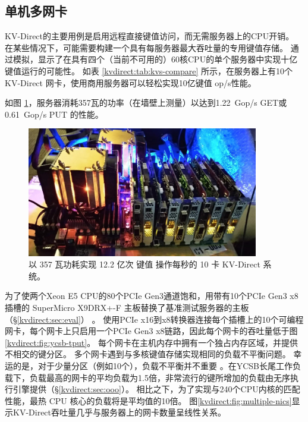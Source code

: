 \subsection{单机多网卡}
\label{kvdirect:sec:multi-nic}

KV-Direct的主要用例是启用远程直接键值访问，而无需服务器上的CPU开销。
在某些情况下，可能需要构建一个具有每服务器最大吞吐量的专用键值存储。
通过模拟，\cite {li2016full}显示了在具有四个（当前不可用的）60核CPU的单个服务器中实现十亿键值运行的可能性。
如表 \ref{kvdirect:tab:kvs-compare} 所示，在服务器上有10个KV-Direct 网卡，使用商用服务器可以轻松实现10亿键值 op/s性能。

如图 \ref{kvdirect:fig:photo}，服务器消耗357瓦的功率（在墙壁上测量）以达到1.22~Gop/s GET或0.61~Gop/s PUT 的性能。


\begin{figure}[htbp]
	\centering
	\includegraphics[width=0.9\textwidth]{figure/kvdirect_photo.jpg}
	\caption{以 357 瓦功耗实现 12.2 亿次 键值 操作每秒的 10 卡 KV-Direct 系统。}
	\label{kvdirect:fig:photo}
\end{figure}

为了使两个Xeon E5 CPU的80个PCIe Gen3通道饱和，用带有10个PCIe Gen3 x8插槽的 SuperMicro X9DRX+-F 主板替换了基准测试服务器的主板（\S\ref {kvdirect:sec:eval}） 。
使用PCIe x16到x8转换器连接每个插槽上的10个可编程网卡，每个网卡上只启用一个PCIe Gen3 x8链路，因此每个网卡的吞吐量低于图 \ref {kvdirect:fig:ycsb-tput}。
每个网卡在主机内存中拥有一个独占内存区域，并提供不相交的键分区。
多个网卡遇到与多核键值存储实现相同的负载不平衡问题。
幸运的是，对于少量分区（例如10个），负载不平衡并不重要 \cite {lim2014mica,li2016full}。在YCSB长尾工作负载下，负载最高的网卡的平均负载为1.5倍，非常流行的键所增加的负载由无序执行引擎提供（\S \ref {kvdirect:sec:ooo}）。
相比之下，为了实现与240个CPU内核的匹配性能，最热 CPU 核心的负载将是平均值的10倍。
图\ref {kvdirect:fig:multiple-nics}显示KV-Direct吞吐量几乎与服务器上的网卡数量呈线性关系。


